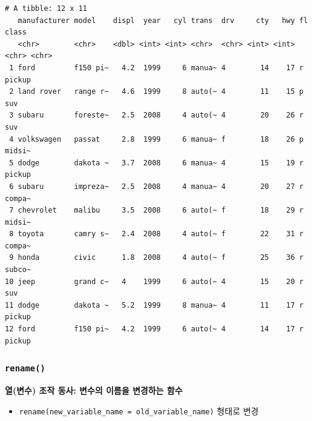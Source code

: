 \documentclass[
  11pt,
]{krantz}
\makeatletter
\newenvironment{Shaded}{\begin{snugshade}}{\end{snugshade}}
\newcommand{\CommentTok}[1]{\textcolor[rgb]{0.37,0.37,0.37}{\textit{#1}}}
\newcommand{\FloatTok}[1]{\textcolor[rgb]{0.06,0.06,0.06}{#1}}
\newcommand{\KeywordTok}[1]{\textcolor[rgb]{0.27,0.27,0.27}{\textbf{#1}}}
\newcommand{\NormalTok}[1]{#1}
\newcommand{\OperatorTok}[1]{\textcolor[rgb]{0.43,0.43,0.43}{\textbf{#1}}}
\newcommand{\StringTok}[1]{\textcolor[rgb]{0.5,0.5,0.5}{#1}}
\providecommand{\tightlist}{%
  \setlength{\itemsep}{0pt}\setlength{\parskip}{0pt}}
\newenvironment{kframe}{%
\medskip{}
\setlength{\fboxsep}{.8em}
 \def\at@end@of@kframe{}%
 \ifinner\ifhmode%
  \def\at@end@of@kframe{\end{minipage}}%
  \begin{minipage}{\columnwidth}%
 \fi\fi%
 \def\FrameCommand##1{\hskip\@totalleftmargin \hskip-\fboxsep
 \colorbox{shadecolor}{##1}\hskip-\fboxsep
     \hskip-\linewidth \hskip-\@totalleftmargin \hskip\columnwidth}%
 \MakeFramed {\advance\hsize-\width
   \@totalleftmargin\z@ \linewidth\hsize
   \@setminipage}}%
 {\par\unskip\endMakeFramed%
 \at@end@of@kframe}
\renewenvironment{quote}{\begin{kframe}}{\end{kframe}}
\makeatother
\begin{document}
\begin{Shaded}
\end{Shaded}

\begin{verbatim}
# A tibble: 12 x 11
   manufacturer model    displ  year   cyl trans  drv     cty   hwy fl    class 
   <chr>        <chr>    <dbl> <int> <int> <chr>  <chr> <int> <int> <chr> <chr> 
 1 ford         f150 pi~   4.2  1999     6 manua~ 4        14    17 r     pickup
 2 land rover   range r~   4.6  1999     8 auto(~ 4        11    15 p     suv   
 3 subaru       foreste~   2.5  2008     4 auto(~ 4        20    26 r     suv   
 4 volkswagen   passat     2.8  1999     6 manua~ f        18    26 p     midsi~
 5 dodge        dakota ~   3.7  2008     6 manua~ 4        15    19 r     pickup
 6 subaru       impreza~   2.5  2008     4 manua~ 4        20    27 r     compa~
 7 chevrolet    malibu     3.5  2008     6 auto(~ f        18    29 r     midsi~
 8 toyota       camry s~   2.4  2008     4 auto(~ f        22    31 r     compa~
 9 honda        civic      1.8  2008     4 auto(~ f        25    36 r     subco~
10 jeep         grand c~   4    1999     6 auto(~ 4        15    20 r     suv   
11 dodge        dakota ~   5.2  1999     8 manua~ 4        11    17 r     pickup
12 ford         f150 pi~   4.2  1999     6 auto(~ 4        14    17 r     pickup
\end{verbatim}

\normalsize

\hypertarget{dplyr-rename}{%
\subsubsection*{\texorpdfstring{\texttt{rename()}}{rename()}}\label{dplyr-rename}}


\begin{quote}
\textbf{열(변수) 조작 동사: 변수의 이름을 변경하는 함수}
\end{quote}

\begin{itemize}
\tightlist
\item
  \texttt{rename(new\_variable\_name\ =\ old\_variable\_name)} 형태로 변경
\end{itemize}
\end{document}

